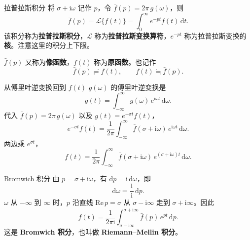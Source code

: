\documentclass[fontset=windows, chinese, 10pt, xcolor=dvipsnames]{beamer}
\begin{document}
\begin{frame}{拉普拉斯积分}
  将 $\sigma+\mathrm{i}\omega$ 记作 $p$，令 $\bar f(p)=2\pi\,g(\omega)$，则
  \begin{equation*}
    \bar f(p)
    =\mathcal{L}\{f(t)\}
    =\int_0^{\infty} e^{-pt}f(t)\,\mathrm{d}t.
  \end{equation*}
  该积分称为\textbf{拉普拉斯积分}，$\mathcal{L}$ 称为\textbf{拉普拉斯变换算符}，$e^{-pt}$ 称为拉普拉斯变换的\textbf{核}。注意这里的积分上下限。
  \vspace{0.4em}

  $\bar f(p)$ 又称为\textbf{像函数}，$f(t)$ 称为\textbf{原函数}。也记作
  \begin{equation*}
    \bar f(p)\risingdotseq f(t),
    \qquad
    f(t)\fallingdotseq\bar f(p).
  \end{equation*}
\end{frame}

\begin{frame}{从傅里叶逆变换回到 $f(t)$}
  $g(\omega)$ 的傅里叶逆变换是
  \begin{equation*}
    g(t)=\int_{-\infty}^{\infty} g(\omega)\,e^{\mathrm{i}\omega t}\,\mathrm{d}\omega.
  \end{equation*}
  代入 $\bar f(p)=2\pi\,g(\omega)$ 以及 $g(t)=e^{-\sigma t}f(t)$，
  \begin{equation*}
    e^{-\sigma t}f(t)
    =\frac{1}{2\pi}\int_{-\infty}^{\infty}
      \bar f(\sigma+\mathrm{i}\omega)\,e^{\mathrm{i}\omega t}\,\mathrm{d}\omega.
  \end{equation*}
  两边乘 $e^{\sigma t}$，
  \begin{equation*}
    f(t)
    =\frac{1}{2\pi}\int_{-\infty}^{\infty}
      \bar f(\sigma+\mathrm{i}\omega)\,
      e^{(\sigma+\mathrm{i}\omega)t}\,\mathrm{d}\omega.
  \end{equation*}
\end{frame}

\begin{frame}{Bromwich 积分}
  由 $p=\sigma+\mathrm{i}\omega$，有 $\mathrm{d}p=\mathrm{i}\,\mathrm{d}\omega$，即
  \begin{equation*}
    \mathrm{d}\omega=\frac{1}{\mathrm{i}}\,\mathrm{d}p.
  \end{equation*}
  $\omega$ 从 $-\infty$ 到 $\infty$ 时，$p$ 沿直线 $\mathrm{Re}\,p=\sigma$ 从 $\sigma-\mathrm{i}\infty$ 走到 $\sigma+\mathrm{i}\infty$。因此
  \begin{equation*}
    f(t)
    =\frac{1}{2\pi\mathrm{i}}
      \int_{\sigma-\mathrm{i}\infty}^{\sigma+\mathrm{i}\infty}
      \bar f(p)\,e^{pt}\,\mathrm{d}p.
  \end{equation*}
  这是 \textbf{Bromwich 积分}，也叫做 \textbf{Riemann--Mellin 积分}。
\end{frame}
\end{document}

